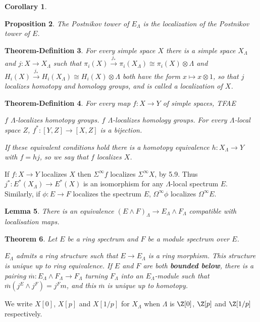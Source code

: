 \documentclass[11pt]{article}
\theoremstyle{plain}
\newtheorem{thm}{Theorem}[subsection]
\newtheorem{lem}[thm]{Lemma}
\newtheorem{prop}[thm]{Proposition}
\newtheorem{cor}[thm]{Corollary}
\newtheorem{thmdef}[thm]{Theorem-Definition}
\theoremstyle{definition}
\begin{document}
{\begin{cor}
\end{cor}
\begin{prop}
The Postnikov tower of $E_\Lambda$ is the localization of the Postnikov tower of
$E$.
\end{prop}
\begin{thmdef}
For every simple space $X$ there is a simple space $X_\Lambda$ and $j:X\to
X_\Lambda$ such that $\pi_i(X)\xrightarrow{j_*}\pi_i(X_\Lambda)\cong
\pi_i(X)\otimes\Lambda$ and $H_i(X)\xrightarrow{j_*}H_i(X_\Lambda)\cong
H_i(X)\otimes\Lambda$ both have the form $x\mapsto x\otimes1$, so that $j$
localizes homotopy and homology groups, and is called a \emph{localization} of
$X$.
\end{thmdef}
\begin{thmdef}
For every map $f:X\to Y$ of simple spaces, TFAE\upcol
\begin{itemise}
\itm[(i)]$f$ $\Lambda$-localizes homotopy groups.
\itm[(ii)]$f$ $\Lambda$-localizes homology groups.
\itm[(iii)]For every $\Lambda$-local space $Z$, $f^*:[Y,Z]\to[X,Z]$ is a
bijection.
\end{itemise}
If these equivalent conditions hold there is a homotopy equivalence
$h:X_\Lambda\to Y$ with $f=hj$, so we say that $f$ \emph{localizes} $X$.
\end{thmdef}
If $f:X\to Y$ localizes $X$ then $\Sigma^\infty f$ localizes $\Sigma^\infty X$,
by 5.9. Thus $j^*:E^*(X_\Lambda)\to E^*(X)$ is an isomorphism for any
$\Lambda$-local spectrum $E$. Similarly, if $\phi:E\to F$ localizes the spectrum
$E$, $\Omega^\infty\phi$ localizes $\Omega^\infty E$.
\begin{lem}
There is an equivalence $(E\wedge F)_\Lambda\to E_\Lambda\wedge F_\Lambda$
compatible with localisation maps.
\end{lem}
\begin{thm} Let $E$ be a ring spectrum and $F$ be a module spectrum over $E$.
\begin{itemise}
\itm $E_\Lambda$ admits a ring structure such that $E\to E_\Lambda$ is a ring
morphism. This structure is unique up to ring equivalence.
\itm If $E$ and $F$ are both \textbf{bounded below}, there is a pairing
$\overline m:E_\Lambda\wedge F_\Lambda\to F_\Lambda$ turning $F_\Lambda$ into an
$E_\Lambda$-module such that $\overline m(j^E\wedge j^F)=j^Fm$, and this
$\overline m$ is unique up to homotopy.
\end{itemise}
\end{thm}
We write $X[0]$, $X[p]$ and $X[1/p]$ for $X_\Lambda$ when $\Lambda$ is $\Z[0]$,
$\Z[p]$ and $\Z[1/p]$ respectively.
}
\end{document}

